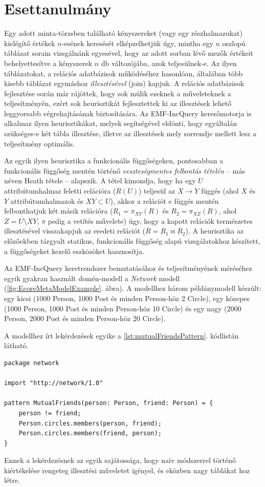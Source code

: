 
\section{Esettanulmány}
\label{sect:caseStudy}

Egy adott minta-törzsben található kényszereket (vagy egy részhalmazukat) kielégítő értékek $n$-esének keresését elképzelhetjük úgy, mintha egy $n$ oszlopú táblázat sorain vizsgálnánk egyesével, hogy az adott sorban lévő mezők értékeit behelyettesítve a kényszerek $n$ db változójába, azok teljesülnek-e.
Az ilyen táblázatokat, a relációs adatbázisok működéséhez hasonlóan, általában több kisebb táblázat egymáshoz \emph{illesztésével} (join) kapjuk.
A relációs adatbázisok fejlesztése során már rájöttek, hogy sok múlik ezeknek a műveleteknek a teljesítményén, ezért sok heurisztikát fejlesztettek ki az illesztések lehető leggyorsabb végrehajtásának biztosítására.
Az EMF-IncQuery keresőmotorja is alkalmaz ilyen heurisztikákat, melyek segítségével eldönti, hogy egyáltalán szükséges-e két tábla illesztése, illetve az illesztések mely sorrendje mellett lesz a teljesítmény optimális.

Az egyik ilyen heurisztika a funkcionális függőségeken, pontosabban a funkcionális függőség mentén történő \emph{veszteségmentes felbontás tételén} -- más néven Heath tétele -- alapszik.
A tétel kimondja, hogy ha egy $U$ attribútumhalmaz feletti relációra ($R(U)$) teljesül az $X \rightarrow Y$ függés (ahol $X$ és $Y$ attribútumhalmazok és $XY \subset U$), akkor a relációt e függés mentén felbonthatjuk két másik relációra ($R_1 = \pi_{XY}(R)$ és $R_2 = \pi_{XZ}(R)$, ahol $Z = U \setminus XY$, $\pi$ pedig a vetítés művelete) úgy, hogy a kapott relációk természetes illesztésével visszakapjuk az eredeti relációt ($R = R_1 \bowtie R_2$).
A heurisztika az előzőekben tárgyalt statikus, funkcionális függőség alapú vizsgálatokhoz készített, a függőségeket kezelő eszközöket hasznosítja.

Az EMF-IncQuery keretrendszer bemutatásához és teljesítményének méréséhez egyik gyakran használt domén-modell a \emph{Network} modell (\ref{fig:EcoreMetaModelExample}. ábra).
A modellhez három példánymodell készült: egy kicsi (1000 Person, 1000 Post és minden Person-höz 2 Circle), egy közepes (1000 Person, 1000 Post és minden Person-höz 10 Circle) és egy nagy (2000 Person, 2000 Post és minden Person-höz 20 Circle).

A modellhez írt lekérdezések egyike a \ref{lst:mutualFriendsPattern}. kódlistán látható.
\begin{lstlisting}[float,floatplacement=htb,caption=MutualFriends minta,label=lst:mutualFriendsPattern]
package network

import "http://network/1.0"

pattern MutualFriends(person: Person, friend: Person) = {
	person != friend;
	Person.circles.members(person, friend);
	Person.circles.members(friend, person);
}
\end{lstlisting}
Ennek a lekérdezésnek az egyik sajátossága, hogy naiv módszerrel történő kiértékelése rengeteg illesztési műveletet igényel, és eközben nagy táblákat hoz létre.

